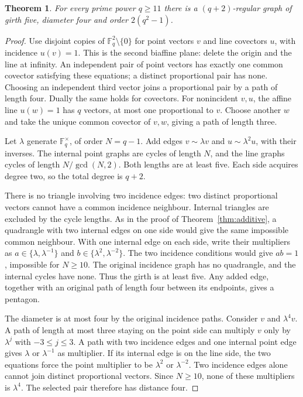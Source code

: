 \documentclass[11pt,a4paper]{article}
\newtheorem{theorem}{Theorem}
\newcommand{\F}{\mathbb F}
\begin{document}
\begin{theorem}\label{thm:multiplicative}
For every prime power $q\geq11$ there is a $(q+2)$-regular graph
of girth five, diameter four and order $2(q^2-1)$.
\end{theorem}
\begin{proof}
Use disjoint copies of $\F_q^2\setminus\{0\}$ for point vectors
$v$ and line covectors $u$, with incidence $u(v)=1$. This is the
second biaffine plane: delete the origin and the line at infinity.
An independent pair of point vectors has exactly one common
covector satisfying these equations; a distinct proportional pair
has none. Choosing an independent third vector joins a proportional
pair by a path of length four. Dually the same holds for covectors.
For nonincident $v,u$, the affine line $u(w)=1$ has $q$ vectors,
at most one proportional to $v$. Choose another $w$ and take the
unique common covector of $v,w$, giving a path of length three.

Let $\lambda$ generate $\F_q^\times$, of order $N=q-1$. Add
edges $v\sim\lambda v$ and $u\sim\lambda^2u$, with their inverses.
The internal point graphs are cycles of length $N$, and the line
graphs cycles of length $N/\gcd(N,2)$. Both lengths are at least
five. Each side acquires degree two, so the total degree is $q+2$.

There is no triangle involving two incidence edges: two distinct
proportional vectors cannot have a common incidence neighbour.
Internal triangles are excluded by the cycle lengths. As in the
proof of Theorem~\ref{thm:additive}, a quadrangle with two internal
edges on one side would give the same impossible common neighbour.
With one internal edge on each side, write their multipliers as
$a\in\{\lambda,\lambda^{-1}\}$ and
$b\in\{\lambda^2,\lambda^{-2}\}$. The two incidence conditions
would give $ab=1$, impossible for $N\geq10$.
The original incidence graph has no quadrangle, and the internal
cycles have none. Thus the girth is at least five. Any added edge,
together with an original path of length four between its endpoints,
gives a pentagon.

The diameter is at most four by the original incidence paths.
Consider $v$ and $\lambda^4v$. A path of length at most three
staying on the point side can multiply $v$ only by $\lambda^j$
with $-3\leq j\leq3$. A path with two incidence edges and one
internal point edge gives $\lambda$ or $\lambda^{-1}$ as multiplier.
If its internal edge is on the line side, the two equations force
the point multiplier to be $\lambda^2$ or $\lambda^{-2}$.
Two incidence edges alone cannot join distinct proportional vectors.
Since $N\geq10$, none of these multipliers is $\lambda^4$.
The selected pair therefore has distance four.
\end{proof}
\end{document}
